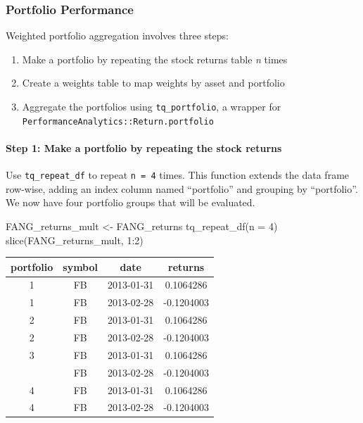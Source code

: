 \subsubsection{Portfolio Performance}\label{portfolio-performance}

Weighted portfolio aggregation involves three steps:

\begin{enumerate}
\def\labelenumi{\arabic{enumi}.}
\tightlist
\item
  Make a portfolio by repeating the stock returns table \emph{n} times
\item
  Create a weights table to map weights by asset and portfolio
\item
  Aggregate the portfolios using \texttt{tq\_portfolio}, a wrapper for
  \texttt{PerformanceAnalytics::Return.portfolio}
\end{enumerate}

\paragraph{Step 1: Make a portfolio by repeating the stock
returns}\label{step-1-make-a-portfolio-by-repeating-the-stock-returns}

Use \texttt{tq\_repeat\_df} to repeat \texttt{n\ =\ 4} times. This
function extends the data frame row-wise, adding an index column named
``portfolio'' and grouping by ``portfolio''. We now have four portfolio
groups that will be evaluated.

\begin{Schunk}
\begin{Sinput}
FANG_returns_mult <- FANG_returns %
    tq_repeat_df(n = 4)
slice(FANG_returns_mult, 1:2)
\end{Sinput}
\end{Schunk}

\begin{tabular}{cccc}
\toprule
portfolio & symbol & date & returns\\
\midrule
1 & FB & 2013-01-31 & 0.1064286\\
1 & FB & 2013-02-28 & -0.1204003\\
2 & FB & 2013-01-31 & 0.1064286\\
2 & FB & 2013-02-28 & -0.1204003\\
3 & FB & 2013-01-31 & 0.1064286\\
\addlinespace
3 & FB & 2013-02-28 & -0.1204003\\
4 & FB & 2013-01-31 & 0.1064286\\
4 & FB & 2013-02-28 & -0.1204003\\
\bottomrule
\end{tabular}

